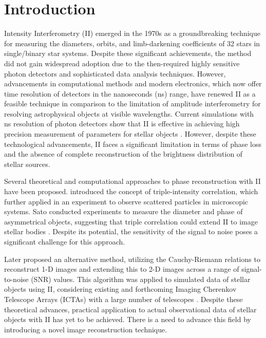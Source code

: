 \section{Introduction}

Intensity Interferometry (II) emerged in the 1970s as a groundbreaking technique for measuring the diameters, orbits, and limb-darkening coefficients of 32 stars in single/binary star systems. Despite these significant achievements, the method did not gain widespread adoption due to the then-required highly sensitive photon detectors and sophisticated data analysis techniques. However, advancements in computational methods and modern electronics, which now offer time resolution of detectors in the nanoseconds (ns) range, have renewed II as a feasible technique in comparison to the limitation of amplitude interferometry for resolving astrophysical objects at visible wavelengths. Current simulations with ns resolution of photon detectors show that II is effective in achieving high precision measurement of parameters for stellar objects \citep{10.1093/mnras/stab2391, 10.1093/mnras/stac2433}. However, despite these technological advancements, II faces a significant limitation in terms of phase loss and the absence of complete reconstruction of the brightness distribution of stellar sources.

Several theoretical and computational approaches to phase reconstruction with II have been proposed. \cite{gamo1963triple} introduced the concept of triple-intensity correlation, which \cite{goldberger1963use} further applied in an experiment to observe scattered particles in microscopic systems. Sato conducted experiments to measure the diameter and phase of asymmetrical objects, suggesting that triple correlation could extend II to image stellar bodies \citep{sato1978imaging, sato1979computer, sato1981adaptive}. Despite its potential, the sensitivity of the signal to noise poses a significant challenge for this approach.

Later \cite{holmes2010two} proposed an alternative method, utilizing the Cauchy-Riemann relations to reconstruct 1-D images and extending this to 2-D images across a range of signal-to-noise (SNR) values. This algorithm was applied to simulated data of stellar objects using II, considering existing and forthcoming Imaging Cherenkov Telescope Arrays (ICTAs) with a large number of telescopes \citep{nunez2010stellar, nunez2012high, nunez2012imaging}. Despite these theoretical advances, practical application to actual observational data of stellar objects with II has yet to be achieved. There is a need to advance this field by introducing a novel image reconstruction technique.

